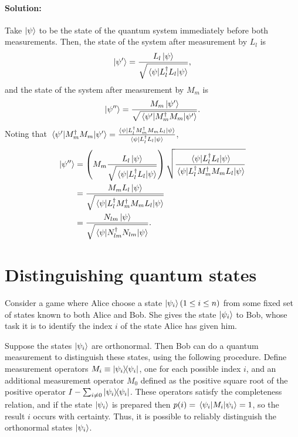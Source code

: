 \paragraph{Solution:} Take $\ket{\psi}$ to be the state of the quantum system
immediately before both measurements. Then, the state of the system after
measurement by $L_l$ is \begin{equation*}
  \ket{\psi'} = \frac{L_l\ket{\psi}}{\sqrt{\mel{\psi}{L_l^\dagger L_l}{\psi}}},
\end{equation*} and the state of the system after measurement by $M_m$ is
\begin{equation*}
  \ket{\psi''} = \frac{M_m\ket{\psi'}}{\sqrt{\mel{\psi'}{M_m^\dagger M_m}
    {\psi'}}}.
\end{equation*}
Noting that $\mel{\psi'}{M_m^\dagger M_m}{\psi'} = \frac{\mel{\psi}{L_l^\dagger
M_m^\dagger M_m L_l}{\psi}}{\mel{\psi}{L_l^\dagger L_l}{\psi}}$,
\begin{align*}
  \ket{\psi''}
  &= \left(M_m\frac{L_l\ket{\psi}}{\sqrt{\mel{\psi}{L_l^\dagger L_l}{\psi}}}
  \right)\sqrt{\frac{\mel{\psi}{L_l^\dagger L_l}{\psi}}{\mel{\psi}{
  L_l^\dagger M_m^\dagger M_m L_l}{\psi}}} \\
  &= \frac{M_mL_l\ket{\psi}}{\sqrt{\mel{\psi}{L_l^\dagger M_m^\dagger M_m L_l}
  {\psi}}} \\
  &= \frac{N_{lm}\ket{\psi}}{\sqrt{\mel{\psi}{N_{lm}^\dagger N_{lm}}{\psi}}}.
\end{align*}

\section{Distinguishing quantum states}

Consider a game where Alice choose a state $\ket{\psi_i} (1 \leq i \leq n)$
from some fixed set of states known to both Alice and Bob. She gives the state
$\ket{\psi_i}$ to Bob, whose task it is to identify the index $i$ of the state
Alice has given him.

Suppose the states $\ket{\psi_i}$ are orthonormal. Then Bob can do a quantum
measurement to distinguish these states, using the following procedure. Define
measurement operators $M_i \equiv \ketbra{\psi_i}{\psi_i}$, one for each
possible index $i$, and an additional measurement operator $M_0$ defined as the
positive square root of the positive operator $I - \sum_{i \neq 0}
\ketbra{\psi_i}{\psi_i}$. These operators satisfy the completeness relation,
and if the state $\ket{\psi_i}$ is prepared then $p(i) = \mel{\psi_i}{M_i}
{\psi_i} = 1$, so the result $i$ occurs with certainty. Thus, it is possible
to reliably distinguish the orthonormal states $\ket{\psi_i}$.

